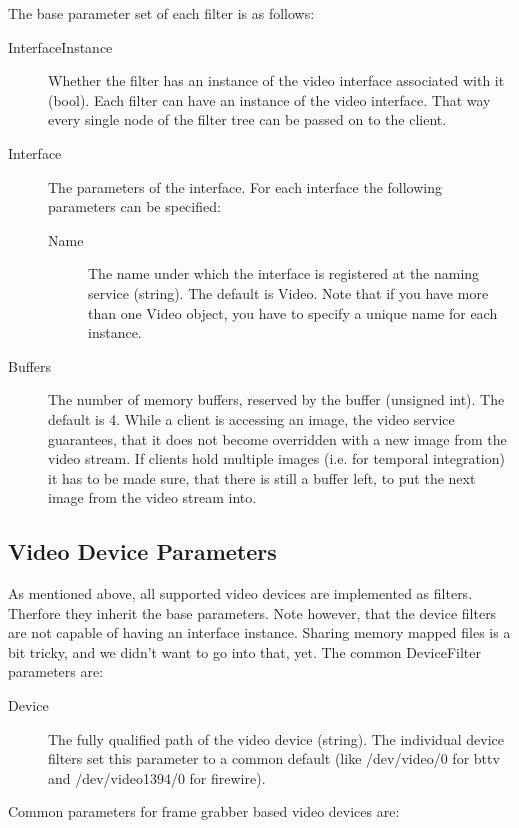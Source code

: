 The base parameter set of each filter is as follows:

\begin{description}
\item[InterfaceInstance] Whether the filter has an instance of the
  video interface associated with it (bool).
  Each filter can have an instance of the video interface. That way
  every single node of the filter tree can be passed on to the client.
\item[Interface] The parameters of the interface. For each interface
  the following parameters can be specified:
  \begin{description}
  \item[Name] The name under which the interface is registered at the
    naming service (string). The default is Video. Note that if
    you have more than one Video object, you have to specify a unique
    name for each instance.
  \end{description}
\item[Buffers] The number of memory buffers, reserved by the buffer
  (unsigned int). The default is 4. While a client is accessing an
  image, the video service guarantees, that it does not become
  overridden with a new image from the video stream. If clients hold
  multiple images (i.e. for temporal integration) it has to be made
  sure, that there is still a buffer left, to put the next image from
  the video stream into.
\end{description}

\subsection{Video Device Parameters}

As mentioned above, all supported video devices are implemented as
filters. Therfore they inherit the base parameters. Note however, that
the device filters are not capable of having an interface
instance. Sharing memory mapped files is a bit tricky, and we didn't
want to go into that, yet. The common DeviceFilter parameters are:

\begin{description}
\item[Device] The fully qualified path of the video device
  (string). The individual device filters set this parameter to
  a common default (like /dev/video/0 for bttv and /dev/video1394/0 for
  firewire).
\end{description}

Common parameters for frame grabber based video devices are:

